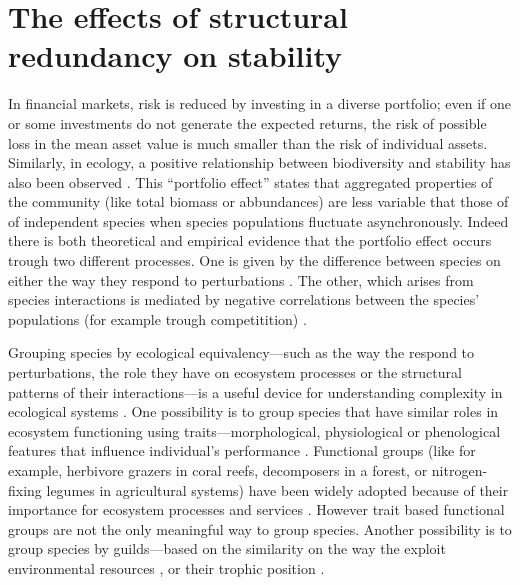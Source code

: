 \documentclass[a4paper]{article}
\begin{document}
\section{The effects of structural redundancy on stability}

In financial markets, risk is reduced by investing in a diverse portfolio; even if one or some investments do not generate the expected returns, the risk of possible loss in the mean asset value is much smaller than the risk of individual assets.
Similarly, in ecology, a positive relationship between biodiversity and stability has also been observed \autocite{Tilman1996, Doak1998,Tilman1998}.
This ``portfolio effect'' states that aggregated properties of the community (like total biomass or abbundances) are less variable that those of of independent species when species populations fluctuate asynchronously.
Indeed there is both theoretical \autocite{Tilman1998} and empirical \autocite{Tilman1996,Tilman2006, Valone2008, Hector2010} evidence that the portfolio effect occurs trough two different processes.
One is given by the difference between species on either the way they respond to perturbations \autocite{Loreau2001}.
The other, which arises from species interactions is mediated by negative correlations between the species' populations (for example trough competitition) \autocite{Doak1998, Tilman1999, Lehman2000, Tilman2006}.

Grouping species by ecological equivalency---such as the way the respond to perturbations, the role they have on ecosystem processes or the structural patterns of their interactions---is a useful device for understanding complexity in ecological systems \autocite{Naeem1998}.
One possibility is to group species that have similar roles in ecosystem functioning using traits---morphological, physiological or phenological features that influence individual's performance \autocite{Raunkiaer1934, Fonseca2001, Mouillot2013}.
Functional groups (like for example, herbivore grazers in coral reefs, decomposers in a forest, or nitrogen-fixing legumes in agricultural systems) have been widely adopted because of their importance for ecosystem processes and services \autocite{Daz2001, Tilman2001a, Wardle2005}.
However trait based functional groups are not the only meaningful way to group species.
Another possibility is to group species by guilds---based on the similarity on the way the exploit environmental resources \autocite{Root1967}, or their trophic position \autocite{Hairston1960}.
\end{document}
